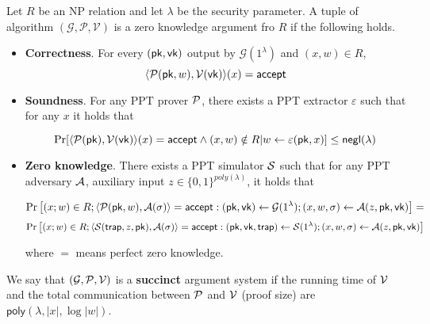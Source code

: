 \begin{definition}\label{def::zkp}
	
	Let $R$ be an NP relation and let $\lambda$ be the security parameter. A tuple of algorithm $(\mathcal{G}, \mathcal{P}, \mathcal{V})$ is a zero knowledge argument fro $R$ if the following holds.
	
	\begin{itemize}
		
		\item \textbf{Correctness}. For every $(\pk, \vk)$ output by $\mathcal{G}(1^\lambda)$ and $(x, w) \in R$, 
		$$\langle \P(\pk, w), \V(\vk) \rangle(x) = \accept$$
		
		\item \textbf{Soundness}. For any PPT prover $\P$, there exists a PPT extractor $\varepsilon$ such that for any $x$ it holds that
		
		$$\Pr[\langle\P(\pk), \V(\vk) \rangle(x) = \accept \wedge (x, w) \notin R | w \leftarrow \varepsilon(\pk, x)] \leq \neg(\lambda)$$
		
		\item \textbf{Zero knowledge}. There exists a PPT simulator $\S$ such that for any PPT adversary $\A$, auxiliary input $z \in \{0, 1\}^{poly(\lambda)}$, it holds that
		
		$$\Pr\left[(x;w)\in R; \langle\P(\pk,w),\A(\sigma) \rangle=\accept: (\pk,\vk)\leftarrow\mathcal{G}(1^\lambda); (x,w,\sigma)\leftarrow\A(z,\pk,\vk) \right] = $$
		$$\Pr\left[(x;w)\in R; \langle\S(\mathsf{trap}, z, \pk),\A(\sigma) \rangle=\accept:(\pk,\vk,\mathsf{trap})\leftarrow\S(1^\lambda); (x,w,\sigma)\leftarrow\A(z,\pk,\vk)\right]$$
		
		where $=$ means perfect zero knowledge. 
		
	\end{itemize}
	We say that $(\mathcal{G},\P,\V)$ is a \textbf{succinct} argument system if the
	running time of $\V$ and the total communication between $\P$ and $\V$ (proof size) are $\mathsf{poly}(\lambda,|x|,\log|w|)$.
\end{definition}



